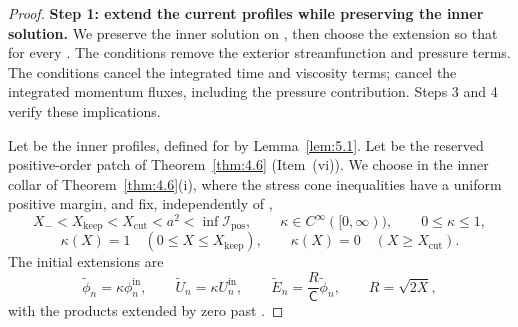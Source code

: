 \begin{proof}
\textbf{Step 1: extend the current profiles while preserving the inner solution.}
We preserve the inner solution on , then choose the extension so that
 for every . The conditions
 remove the exterior streamfunction and pressure terms. The conditions
 cancel the integrated time and viscosity terms;
 cancel the integrated momentum fluxes, including the pressure
contribution. Steps 3 and 4 verify these implications.

Let  be the inner profiles, defined for
 by Lemma~\ref{lem:5.1}. Let  be the reserved
positive-order patch of Theorem~\ref{thm:4.6} (Item~\textup{(vi)}). We choose  in the
inner collar of Theorem~\ref{thm:4.6}\textup{(i)}, where the stress cone inequalities have a uniform positive
margin, and fix, independently of ,
\[
X_-<X_{\mathrm{keep}}<X_{\mathrm{cut}}<a^2<\inf\mathcal I_{\mathrm{pos}},
\qquad
\kappa\in C^\infty([0,\infty)),
\qquad
0\leq\kappa\leq1,
\]
\[
\kappa(X)=1\quad(0\leq X\leq X_{\mathrm{keep}}),
\qquad
\kappa(X)=0\quad(X\geq X_{\mathrm{cut}}).
\]
The initial extensions are
\[
\widetilde\phi_n=\kappa\phi_n^{\mathrm{in}},
\qquad
\widetilde U_n=\kappa U_n^{\mathrm{in}},
\qquad
\widetilde E_n=\frac{R}{\mathsf C}\widetilde\phi_n,
\qquad
R=\sqrt{2X},
\]
with the products extended by zero past .


\end{proof}

